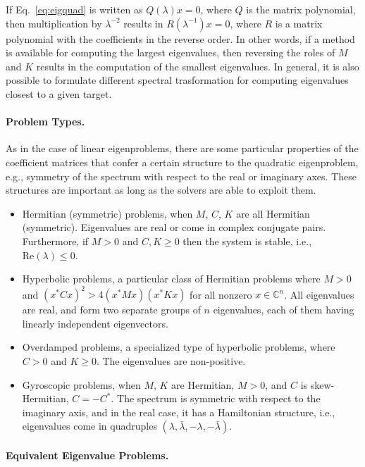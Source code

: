 If Eq.\ \ref{eq:eigquad} is written as $Q(\lambda)x=0$, where $Q$ is the matrix polynomial, then multiplication by $\lambda^{-2}$ results in $R(\lambda^{-1})x=0$, where $R$ is a matrix polynomial with the coefficients in the reverse order. In other words, if a method is available for computing the largest eigenvalues, then reversing the roles of $M$ and $K$ results in the computation of the smallest eigenvalues. In general, it is also possible to formulate different spectral trasformation for computing eigenvalues closest to a given target.

\paragraph{Problem Types.}

As in the case of linear eigenproblems, there are some particular properties of the coefficient matrices that confer a certain structure to the quadratic eigenproblem, e.g., symmetry of the spectrum with respect to the real or imaginary axes. These structures are important as long as the solvers are able to exploit them.

\begin{itemize}
\item Hermitian (symmetric) problems, when $M$, $C$, $K$ are all Hermitian (symmetric). Eigenvalues are real or come in complex conjugate pairs. Furthermore, if $M>0$ and $C,K\geq 0$ then the system is stable, i.e., $\text{Re}(\lambda)\leq 0$.
\item Hyperbolic problems, a particular class of Hermitian problems where $M>0$ and $(x^*Cx)^2>4(x^*Mx)(x^*Kx)$ for all nonzero $x\in\mathbb{C}^n$. All eigenvalues are real, and form two separate groups of $n$ eigenvalues, each of them having linearly independent eigenvectors.
\item Overdamped problems, a specialized type of hyperbolic problems, where $C>0$ and $K\geq 0$. The eigenvalues are non-positive.
\item Gyroscopic problems, when $M$, $K$ are Hermitian, $M>0$, and $C$ is skew-Hermitian, $C=-C^*$. The spectrum is symmetric with respect to the imaginary axis, and in the real case, it has a Hamiltonian structure, i.e., eigenvalues come in quadruples $(\lambda,\bar{\lambda},-\lambda,-\bar{\lambda})$.
\end{itemize}

\paragraph{Equivalent Eigenvalue Problems.}

